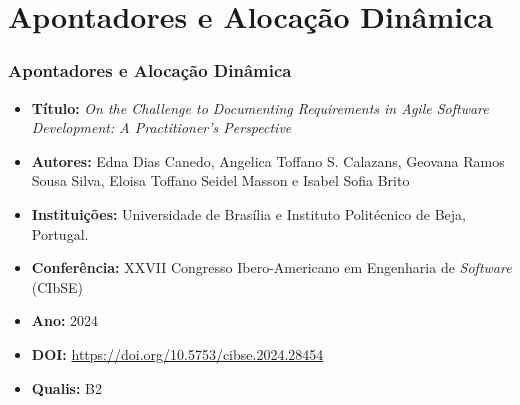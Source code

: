 \section{Apontadores e Alocação Dinâmica}
\begin{frame}
	\frametitle{Apontadores e Alocação Dinâmica}
	\begin{itemize}
		\item \textbf{Título:}	\textit{On the Challenge to Documenting Requirements in Agile Software Development: A Practitioner’s Perspective}
		
		
		\item \textbf{Autores:}	Edna Dias Canedo, Angelica Toffano S. Calazans, Geovana Ramos Sousa Silva, Eloisa Toffano Seidel Masson e Isabel Sofia Brito 
		
		\item \textbf{Instituições:} Universidade de Brasília e Instituto Politécnico de Beja, Portugal.
		
		\item \textbf{Conferência:}	XXVII Congresso Ibero-Americano em Engenharia de \textit{Software} (CIbSE) 
		
		\item \textbf{Ano:}	2024 
		
		\item \textbf{DOI:}	\url{https://doi.org/10.5753/cibse.2024.28454}
		
		\item \textbf{Qualis:} B2
	\end{itemize}
\end{frame}




